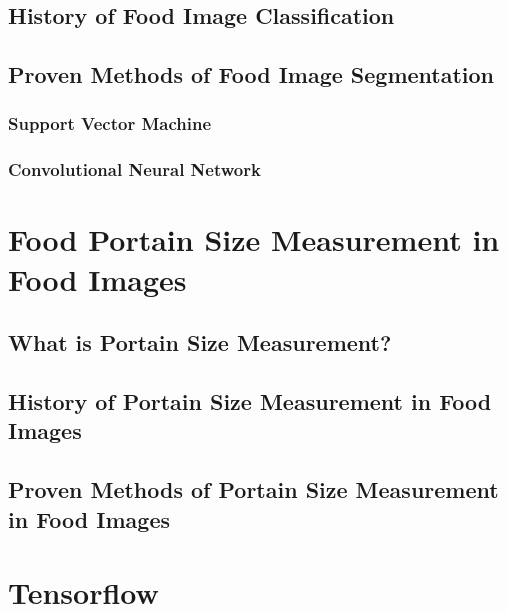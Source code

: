 \subsection{History of Food Image Classification}

\subsection{Proven Methods of Food Image Segmentation}
\subsubsection{Support Vector Machine}
\subsubsection{Convolutional Neural Network}


\section{Food Portain Size Measurement in Food Images}
\subsection{What is Portain Size Measurement?}

\subsection{History of Portain Size Measurement in Food Images}

\subsection{Proven Methods of Portain Size Measurement in Food Images}


\section{Tensorflow}

